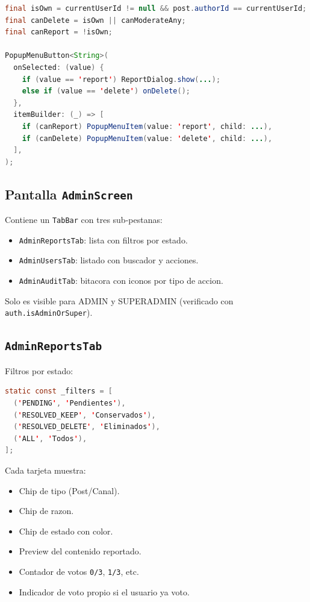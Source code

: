 \begin{lstlisting}[language=Java]
final isOwn = currentUserId != null && post.authorId == currentUserId;
final canDelete = isOwn || canModerateAny;
final canReport = !isOwn;

PopupMenuButton<String>(
  onSelected: (value) {
    if (value == 'report') ReportDialog.show(...);
    else if (value == 'delete') onDelete();
  },
  itemBuilder: (_) => [
    if (canReport) PopupMenuItem(value: 'report', child: ...),
    if (canDelete) PopupMenuItem(value: 'delete', child: ...),
  ],
);
\end{lstlisting}

\subsection{Pantalla \texttt{AdminScreen}}

Contiene un \texttt{TabBar} con tres sub-pestanas:

\begin{itemize}[leftmargin=*]
  \item \texttt{AdminReportsTab}: lista con filtros por estado.
  \item \texttt{AdminUsersTab}: listado con buscador y acciones.
  \item \texttt{AdminAuditTab}: bitacora con iconos por tipo de accion.
\end{itemize}

Solo es visible para ADMIN y SUPERADMIN (verificado con \texttt{auth.isAdminOrSuper}).

\subsection{\texttt{AdminReportsTab}}

Filtros por estado:

\begin{lstlisting}[language=Java]
static const _filters = [
  ('PENDING', 'Pendientes'),
  ('RESOLVED_KEEP', 'Conservados'),
  ('RESOLVED_DELETE', 'Eliminados'),
  ('ALL', 'Todos'),
];
\end{lstlisting}

Cada tarjeta muestra:

\begin{itemize}[leftmargin=*]
  \item Chip de tipo (Post/Canal).
  \item Chip de razon.
  \item Chip de estado con color.
  \item Preview del contenido reportado.
  \item Contador de votos \texttt{0/3}, \texttt{1/3}, etc.
  \item Indicador de voto propio si el usuario ya voto.
\end{itemize}

